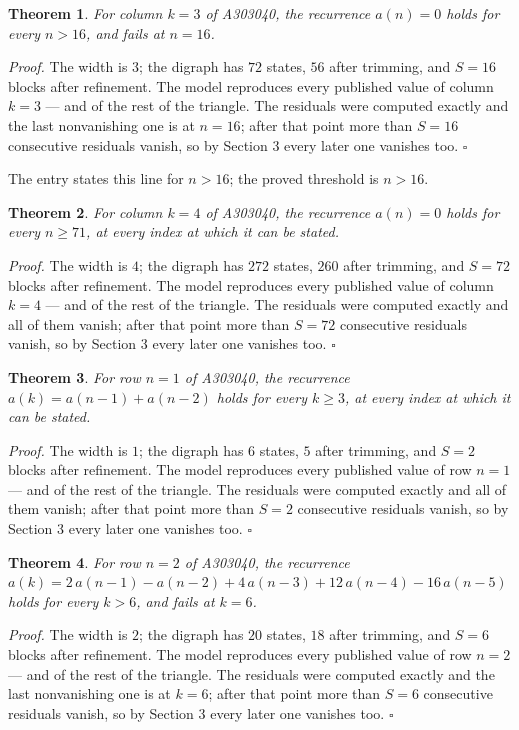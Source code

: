 \documentclass[11pt]{article}
\newtheorem{theorem}{Theorem}
\theoremstyle{definition}
\begin{document}
\begin{theorem} For column $k = 3$ of A303040, the recurrence $a(n) = 0$ holds for every $n > 16$, and fails at $n = 16$.\end{theorem}

{\itshape Proof.} The width is $3$; the digraph has $72$ states, $56$ after trimming, and $S = 16$ blocks after refinement. The model reproduces every published value of column $k = 3$ --- and of the rest of the triangle. The residuals were computed exactly and the last nonvanishing one is at $n = 16$; after that point more than $S = 16$ consecutive residuals vanish, so by Section 3 every later one vanishes too. $\square$

The entry states this line for $n > 16$; the proved threshold is $n > 16$.

\begin{theorem} For column $k = 4$ of A303040, the recurrence $a(n) = 0$ holds for every $n \ge 71$, at every index at which it can be stated.\end{theorem}

{\itshape Proof.} The width is $4$; the digraph has $272$ states, $260$ after trimming, and $S = 72$ blocks after refinement. The model reproduces every published value of column $k = 4$ --- and of the rest of the triangle. The residuals were computed exactly and all of them vanish; after that point more than $S = 72$ consecutive residuals vanish, so by Section 3 every later one vanishes too. $\square$

\begin{theorem} For row $n = 1$ of A303040, the recurrence $a(k) = a(n-1) + a(n-2)$ holds for every $k \ge 3$, at every index at which it can be stated.\end{theorem}

{\itshape Proof.} The width is $1$; the digraph has $6$ states, $5$ after trimming, and $S = 2$ blocks after refinement. The model reproduces every published value of row $n = 1$ --- and of the rest of the triangle. The residuals were computed exactly and all of them vanish; after that point more than $S = 2$ consecutive residuals vanish, so by Section 3 every later one vanishes too. $\square$

\begin{theorem} For row $n = 2$ of A303040, the recurrence $a(k) = 2\,a(n-1) - a(n-2) + 4\,a(n-3) + 12\,a(n-4) - 16\,a(n-5)$ holds for every $k > 6$, and fails at $k = 6$.\end{theorem}

{\itshape Proof.} The width is $2$; the digraph has $20$ states, $18$ after trimming, and $S = 6$ blocks after refinement. The model reproduces every published value of row $n = 2$ --- and of the rest of the triangle. The residuals were computed exactly and the last nonvanishing one is at $k = 6$; after that point more than $S = 6$ consecutive residuals vanish, so by Section 3 every later one vanishes too. $\square$
\end{document}
